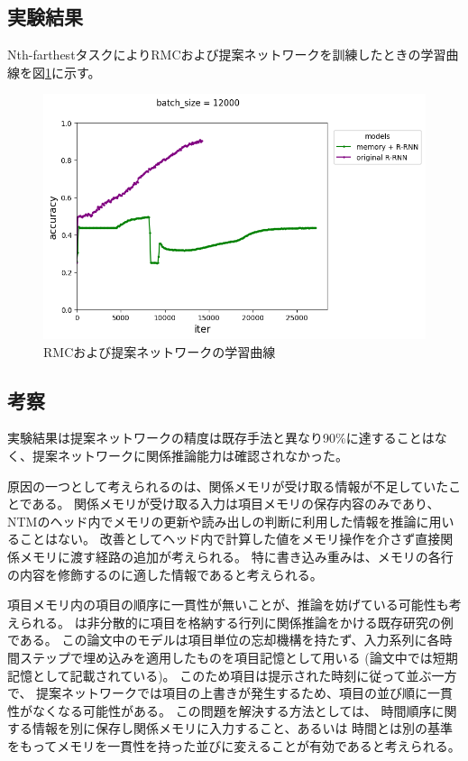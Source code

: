 \subsection{実験結果}
Nth-farthestタスクによりRMCおよび提案ネットワークを訓練したときの学習曲線を図\ref{fig:nth_result}に示す。
\begin{figure}[t]
	\centering
	\includegraphics[width=\linewidth]{./figure/nth/orig_rrnn_id1.png}
	\caption{RMCおよび提案ネットワークの学習曲線}
	\label{fig:nth_result}
\end{figure}

\subsection{考察}\label{chap:nth-cons}
実験結果は提案ネットワークの精度は既存手法と異なり90\%に達することはなく、提案ネットワークに関係推論能力は確認されなかった。

原因の一つとして考えられるのは、関係メモリが受け取る情報が不足していたことである。
関係メモリが受け取る入力は項目メモリの保存内容のみであり、
NTMのヘッド内でメモリの更新や読み出しの判断に利用した情報を推論に用いることはない。
改善としてヘッド内で計算した値をメモリ操作を介さず直接関係メモリに渡す経路の追加が考えられる。
特に書き込み重みは、メモリの各行の内容を修飾するのに適した情報であると考えられる。

項目メモリ内の項目の順序に一貫性が無いことが、推論を妨げている可能性も考えられる。
\cite{working2mem}は非分散的に項目を格納する行列に関係推論をかける既存研究の例である。
この論文中のモデルは項目単位の忘却機構を持たず、入力系列に各時間ステップで埋め込みを適用したものを項目記憶として用いる
(論文中では短期記憶として記載されている)。
このため項目は提示された時刻に従って並ぶ一方で、
提案ネットワークでは項目の上書きが発生するため、項目の並び順に一貫性がなくなる可能性がある。
この問題を解決する方法としては、
時間順序に関する情報を別に保存し関係メモリに入力すること、あるいは
時間とは別の基準をもってメモリを一貫性を持った並びに変えることが有効であると考えられる。

